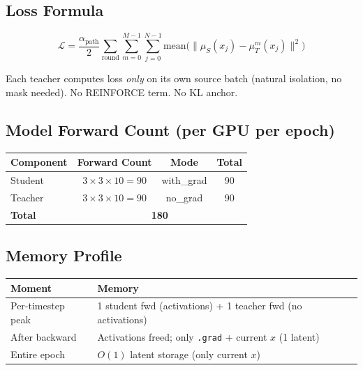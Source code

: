 \documentclass[11pt]{article}
\begin{document}
\subsection{Loss Formula}

\begin{equation}
\mathcal{L} = \frac{\alpha_\text{path}}{2} \sum_{\text{round}} \sum_{m=0}^{M-1} \sum_{j=0}^{N-1} \text{mean}\bigl(\|\mu_S(x_j) - \mu_T^m(x_j)\|^2\bigr)
\end{equation}

Each teacher computes loss \emph{only} on its own source batch (natural isolation, no mask needed). No REINFORCE term. No KL anchor.

\subsection{Model Forward Count (per GPU per epoch)}

\begin{table}[h]
\centering
\begin{tabular}{lccc}
\toprule
Component & Forward Count & Mode & Total \\
\midrule
Student & $3 \times 3 \times 10 = 90$ & with\_grad & 90 \\
Teacher & $3 \times 3 \times 10 = 90$ & no\_grad & 90 \\
\midrule
\textbf{Total} & \multicolumn{3}{c}{\textbf{180}} \\
\bottomrule
\end{tabular}
\end{table}

\subsection{Memory Profile}

\begin{table}[h]
\centering
\begin{tabular}{ll}
\toprule
Moment & Memory \\
\midrule
Per-timestep peak & 1 student fwd (activations) + 1 teacher fwd (no activations) \\
After backward & Activations freed; only \texttt{.grad} + current $x$ (1 latent) \\
Entire epoch & $O(1)$ latent storage (only current $x$) \\
\bottomrule
\end{tabular}
\end{table}

\end{document}
